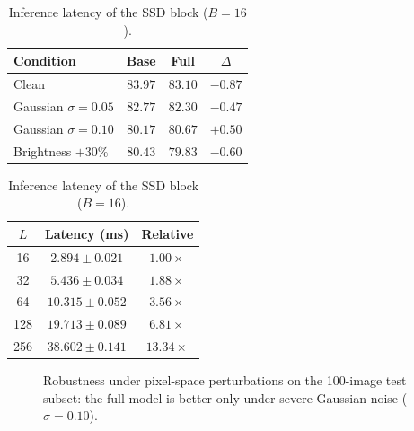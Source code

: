 \documentclass[runningheads,a4paper]{llncs}
\begin{document}
\begin{table}[t]
\centering
\begin{minipage}[t]{0.49\textwidth}
\centering
\caption{Corruption stress test (Mean Recall, 100-image subset).}
\label{tab:robustness}
\scriptsize
\setlength{\tabcolsep}{3pt}
\begin{tabular}{@{}lccc@{}}
\toprule
\textbf{Condition} & \textbf{Base} & \textbf{Full} & \textbf{$\Delta$} \\
\midrule
Clean & $83.97$ & $83.10$ & $-0.87$ \\
Gaussian $\sigma=0.05$ & $82.77$ & $82.30$ & $-0.47$ \\
Gaussian $\sigma=0.10$ & $80.17$ & $\mathbf{80.67}$ & $\mathbf{+0.50}$ \\
Brightness $+30\%$ & $80.43$ & $79.83$ & $-0.60$ \\
\bottomrule
\end{tabular}
\end{minipage}\hfill
\begin{minipage}[t]{0.49\textwidth}
\centering
\caption{Inference latency of the SSD block ($B=16$).}
\label{tab:scaling}
\scriptsize
\setlength{\tabcolsep}{3pt}
\begin{tabular}{@{}ccc@{}}
\toprule
\textbf{$L$} & \textbf{Latency (ms)} & \textbf{Relative} \\
\midrule
16 & $2.894 \pm 0.021$ & $1.00\times$ \\
32 & $5.436 \pm 0.034$ & $1.88\times$ \\
64 & $10.315 \pm 0.052$ & $3.56\times$ \\
128 & $19.713 \pm 0.089$ & $6.81\times$ \\
256 & $38.602 \pm 0.141$ & $13.34\times$ \\
\bottomrule
\end{tabular}
\end{minipage}
\end{table}

\begin{figure}[!htbp]
\centering
{}
\caption{Robustness under pixel-space perturbations on the 100-image test subset: the full model is better only under severe Gaussian noise ($\sigma=0.10$).}
\label{fig:robustness}
\end{figure}
\end{document}
